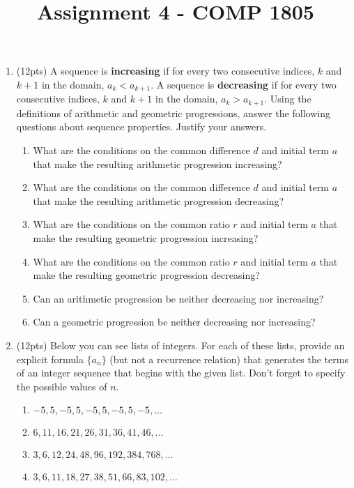 \documentclass{article}
\begin{document}

\title{Assignment 4 - COMP 1805}
\date{} %
\maketitle
\thispagestyle{fancy}



\medskip
\begin{enumerate}
\item(12pts) A sequence is \textbf{increasing} if for every two consecutive indices, $k$ and $k+1$ in the domain, $a_{k} < a_{k+1}$. A sequence is \textbf{decreasing} if for every two consecutive indices, $k$ and $k+1$ in the domain, $a_{k} > a_{k+1}$.
Using the definitions of arithmetic and geometric progressions, answer the following questions about sequence properties. Justify your answers.
\begin{enumerate}
\item What are the conditions on the common difference $d$ and initial term $a$ that make the resulting arithmetic progression increasing?
\item What are the conditions on the common difference $d$ and initial term $a$ that make the resulting arithmetic progression decreasing?
\item What are the conditions on the common ratio $r$ and initial term $a$ that make the resulting geometric progression increasing?
\item What are the conditions on the common ratio $r$ and initial term $a$ that make the resulting geometric progression decreasing?
\item Can an arithmetic progression be neither decreasing nor increasing? 
\item Can a geometric progression be neither decreasing nor increasing? 
\end{enumerate}

 

\item(12pts) Below you can see lists of integers. For each of these lists, provide an explicit formula $\{a_n\}$ (but not a recurrence relation) that generates the terms of an integer sequence that begins with the given list. Don't forget to specify the possible values of $n$.
\begin{enumerate}
\item $-5, 5, -5, 5, -5, 5, -5, 5, -5,\dots$
\item $6, 11, 16, 21, 26, 31, 36, 41, 46,\dots$
\item $3, 6, 12, 24, 48, 96, 192, 384, 768, \dots$
\item $3, 6, 11, 18, 27, 38, 51, 66, 83, 102, \dots$
\end{enumerate}




\end{enumerate}
\end{document}
